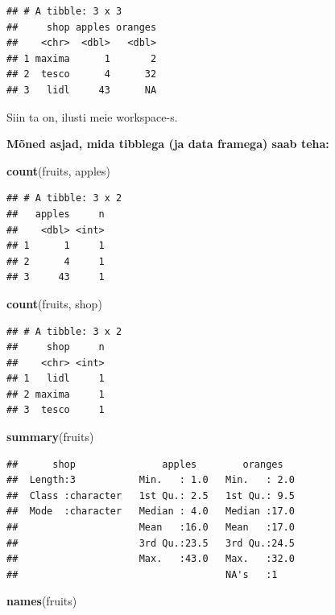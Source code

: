 \documentclass[]{book}
\newenvironment{Shaded}{\begin{snugshade}}{\end{snugshade}}
\newcommand{\KeywordTok}[1]{\textcolor[rgb]{0.13,0.29,0.53}{\textbf{#1}}}
\newcommand{\NormalTok}[1]{#1}
\begin{document}
\begin{verbatim}
## # A tibble: 3 x 3
##     shop apples oranges
##    <chr>  <dbl>   <dbl>
## 1 maxima      1       2
## 2  tesco      4      32
## 3   lidl     43      NA
\end{verbatim}

Siin ta on, ilusti meie workspace-s.

\textbf{Mõned asjad, mida tibblega (ja data framega) saab teha:}

\begin{Shaded}
\begin{Highlighting}[]
\KeywordTok{count}\NormalTok{(fruits, apples)}
\end{Highlighting}
\end{Shaded}

\begin{verbatim}
## # A tibble: 3 x 2
##   apples     n
##    <dbl> <int>
## 1      1     1
## 2      4     1
## 3     43     1
\end{verbatim}

\begin{Shaded}
\begin{Highlighting}[]
\KeywordTok{count}\NormalTok{(fruits, shop)}
\end{Highlighting}
\end{Shaded}

\begin{verbatim}
## # A tibble: 3 x 2
##     shop     n
##    <chr> <int>
## 1   lidl     1
## 2 maxima     1
## 3  tesco     1
\end{verbatim}

\begin{Shaded}
\begin{Highlighting}[]
\KeywordTok{summary}\NormalTok{(fruits)}
\end{Highlighting}
\end{Shaded}

\begin{verbatim}
##      shop               apples        oranges    
##  Length:3           Min.   : 1.0   Min.   : 2.0  
##  Class :character   1st Qu.: 2.5   1st Qu.: 9.5  
##  Mode  :character   Median : 4.0   Median :17.0  
##                     Mean   :16.0   Mean   :17.0  
##                     3rd Qu.:23.5   3rd Qu.:24.5  
##                     Max.   :43.0   Max.   :32.0  
##                                    NA's   :1
\end{verbatim}

\begin{Shaded}
\begin{Highlighting}[]
\KeywordTok{names}\NormalTok{(fruits)}
\end{Highlighting}
\end{Shaded}
\end{document}
